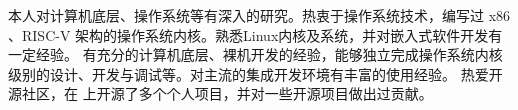 \documentclass[zh]{resume}
\begin{document}
\makeheader

{\onehalfspacing
\hspace{2em}
本人对计算机底层、操作系统等有深入的研究。热衷于操作系统技术，编写过 x86 、RISC-V 架构的操作系统内核。熟悉Linux内核及系统，并对嵌入式软件开发有一定经验。 
有充分的计算机底层、裸机开发的经验，能够独立完成操作系统内核级别的设计、开发与调试等。对主流的集成开发环境有丰富的使用经验。
热爱开源社区，在 上开源了多个个人项目，并对一些开源项目做出过贡献。
\par}


\begin{competences}[7em]
\end{competences}


\end{document}
